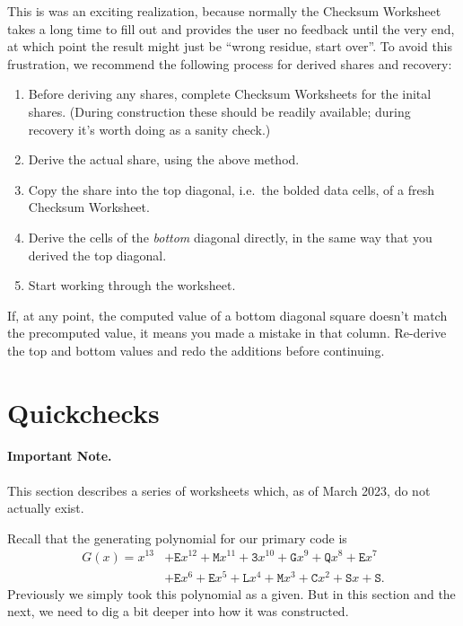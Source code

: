 \documentclass[letterpaper]{article}
\newcommand{\vc}[1]{\texttt{#1}} %
\begin{document}
This is was an exciting realization, because normally the Checksum Worksheet takes
a long time to fill out and provides the user no feedback until the very end, at
which point the result might just be ``wrong residue, start over''. To avoid this
frustration, we recommend the following process for derived shares and recovery:
\begin{enumerate}
\item Before deriving any shares, complete Checksum Worksheets for the inital
shares. (During construction these should be readily available; during recovery
it's worth doing as a sanity check.)
\item Derive the actual share, using the above method.
\item Copy the share into the top diagonal, i.e.~the bolded data cells, of a fresh
Checksum Worksheet.
\item Derive the cells of the \emph{bottom} diagonal directly, in the same way that
you derived the top diagonal.
\item Start working through the worksheet.
\end{enumerate}

If, at any point, the computed value of a bottom diagonal square doesn't match
the precomputed value, it means you made a mistake in that column. Re-derive the
top and bottom values and redo the additions before continuing.

\section{Quickchecks}

\paragraph{Important Note.} {\color{BrickRed}This section describes a series of
worksheets which, as of March 2023, do not actually exist.}

Recall that the generating polynomial for our primary code is
\begin{align*}
    G(x) = x^{13}
      &+ \vc{E}x^{12} + \vc{M}x^{11} + \vc{3}x^{10} + \vc{G}x^9 + \vc{Q}x^8 + \vc{E}x^7 \\
      &+ \vc{E}x^6 + \vc{E}x^5 + \vc{L}x^4 + \vc{M}x^3 + \vc{C}x^2 + \vc{S}x + \vc{S}.
\end{align*}
Previously we simply took this polynomial as a given. But in this section and the
next, we need to dig a bit deeper into how it was constructed.
\end{document}
